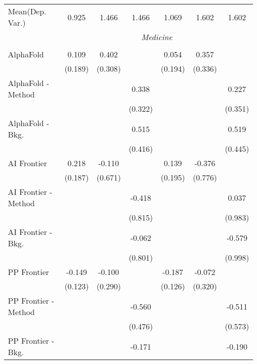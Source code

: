 \begin{tabular}{lcccccc}
Mean(Dep. Var.) & 0.925 & 1.466 & 1.466 & 1.069 & 1.602 & 1.602 \\
 & \multicolumn{6}{c}{\textit{Medicine}} \\ \\
   AlphaFold            & 0.109          & 0.402   &         & 0.054         & 0.357   &   \\   
                        & (0.189)        & (0.308) &         & (0.194)       & (0.336) &   \\   
   AlphaFold - Method   &                &         & 0.338   &               &         & 0.227\\   
                        &                &         & (0.322) &               &         & (0.351)\\   
   AlphaFold - Bkg.     &                &         & 0.515   &               &         & 0.519\\   
                        &                &         & (0.416) &               &         & (0.445)\\   
   AI Frontier          & 0.218          & -0.110  &         & 0.139         & -0.376  &   \\   
                        & (0.187)        & (0.671) &         & (0.195)       & (0.776) &   \\   
   AI Frontier - Method &                &         & -0.418  &               &         & 0.037\\   
                        &                &         & (0.815) &               &         & (0.983)\\   
   AI Frontier - Bkg.   &                &         & -0.062  &               &         & -0.579\\   
                        &                &         & (0.801) &               &         & (0.998)\\   
   PP Frontier          & -0.149         & -0.100  &         & -0.187        & -0.072  &   \\   
                        & (0.123)        & (0.290) &         & (0.126)       & (0.320) &   \\   
   PP Frontier - Method &                &         & -0.560  &               &         & -0.511\\   
                        &                &         & (0.476) &               &         & (0.573)\\   
   PP Frontier - Bkg.   &                &         & -0.171  &               &         & -0.190\\   

\end{tabular}
